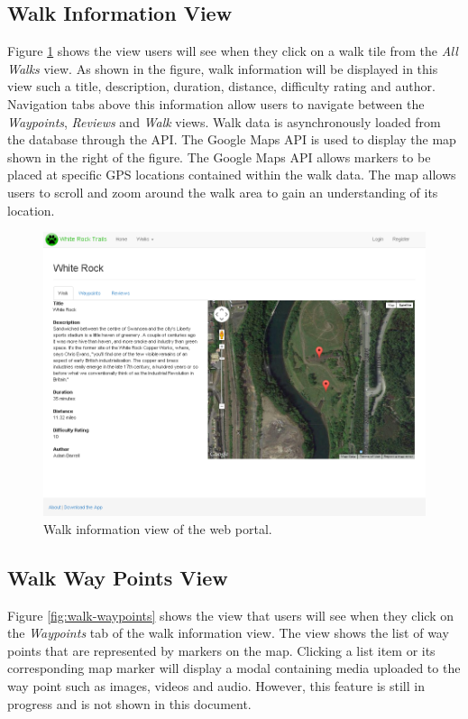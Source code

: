 \documentclass[11pt,a4paper]{article}
\begin{document}
\subsection{Walk Information View}

Figure \ref{fig:walk-info} shows the view users will see when they click on a walk tile from the \emph{All Walks} view. As shown in the figure, walk information will be displayed in this view such a title, description, duration, distance, difficulty rating and author. Navigation tabs above this information allow users to navigate between the \emph{Waypoints}, \emph{Reviews} and \emph{Walk} views. Walk data is asynchronously loaded from the database through the API. The Google Maps API is used to display the map shown in the right of the figure. The Google Maps API allows markers to be placed at specific GPS locations contained within the walk data. The map allows users to scroll and zoom around the walk area to gain an understanding of its location.

\begin{figure}[H]
\centering
\includegraphics[width=0.8\linewidth]{./img/webportal/walk-info}
\caption{Walk information view of the web portal.}
\label{fig:walk-info}
\end{figure}

\subsection{Walk Way Points View}

Figure \ref{fig:walk-waypoints} shows the view that users will see when they click on the \emph{Waypoints} tab of the walk information view. The view shows the list of way points that are represented by markers on the map. Clicking a list item or its corresponding map marker will display a modal containing media uploaded to the way point such as images, videos and audio. However, this feature is still in progress and is not shown in this document.
\end{document}
